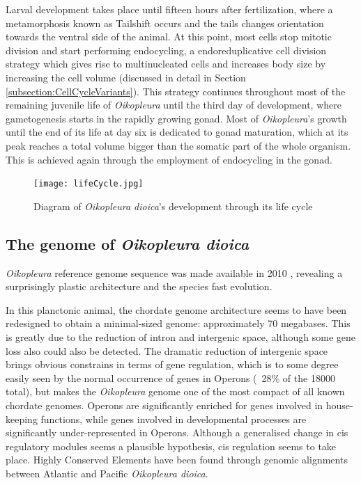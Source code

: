 \documentclass[11pt,twoside,a4paper]{report}
\begin{document}
		Larval development takes place until fifteen hours after fertilization, where a metamorphosis known as Tailshift occurs and the tails changes orientation towards the ventral side of the animal. At this point, most cells stop mitotic division and start performing endocycling, a endoreduplicative cell division strategy which gives rise to multinucleated cells and increases body size by increasing the cell volume (discussed in detail in Section \ref{subsection:CellCycleVariants}). This strategy continues throughout most of the remaining juvenile life of \textit{Oikopleura} until the third day of development, where gametogenesis starts in the rapidly growing gonad. Most of \textit{Oikopleura}'s growth until the end of its life at day six is dedicated to gonad maturation, which at its peak reaches a total volume bigger than the somatic part of the whole organism. This is achieved again through the employment of endocycling in the gonad.
		
		\begin{figure}[here]
			\centering
			\texttt{[image: lifeCycle.jpg]}
			\caption{Diagram of \textit{Oikopleura dioica}'s development through its life cycle}
			\label{fig:LifeCycle}
		\end{figure}
		

		\subsection{The genome of \textit{Oikopleura dioica}}
		\textit{Oikopleura} reference genome sequence was made available in 2010 \cite{}, revealing a surprisingly plastic architecture and the species fast evolution.

		In this planctonic animal, the chordate genome architecture seems to have been redesigned to obtain a minimal-sized genome: approximately 70 megabases. This is greatly due to the reduction of intron and intergenic space, although some gene loss also could also be detected. The dramatic reduction of intergenic space brings obvious constrains in terms of gene regulation, which is to some degree easily seen by the normal occurrence of genes in Operons (~28\% of the 18000 total), but makes the \textit{Oikopleura} genome one of the most compact of all known chordate genomes.
		Operons are significantly enriched for genes involved in house-keeping functions, while genes involved in developmental processes are significantly under-represented in Operons.
		Although a generalised change in cis regulatory modules seems a plausible hypothesis, cis regulation seems to take place. Highly Conserved Elements have been found through genomic alignments between Atlantic and Pacific \textit{Oikopleura dioica}.
		
\end{document}

